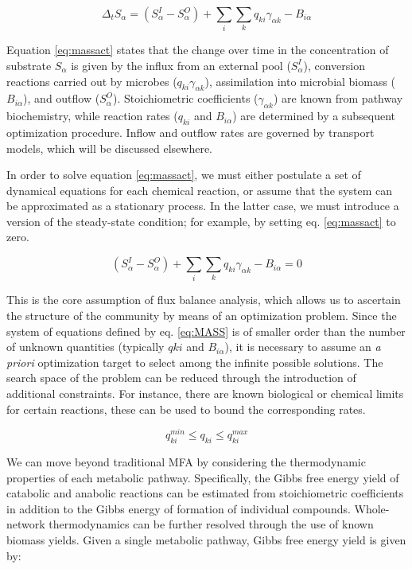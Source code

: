 \begin{equation}
    \Delta_{t} S_{\alpha} = (S_{\alpha}^{I} - S_{\alpha}^{O}) + \sum_{i} \sum_{k} q_{ki}\gamma_{\alpha k} - B_{i\alpha} 
    \label{eq:massact}
\end{equation}

Equation \ref{eq:massact} states that the change over time in the concentration of substrate $S_{\alpha}$ is given by the influx from an external pool ($S_{\alpha}^{I}$), conversion reactions carried out by microbes ($q_{ki}\gamma_{\alpha k}$), assimilation into microbial biomass ($B_{i\alpha}$), and outflow ($S_{\alpha}^{O}$). Stoichiometric coefficients ($\gamma_{\alpha k}$) are known from pathway biochemistry, while reaction rates ($q_{ki}$ and $B_{i\alpha}$) are determined by a subsequent optimization procedure. Inflow and outflow rates are governed by transport models, which will be discussed elsewhere.

In order to solve equation \ref{eq:massact}, we must either postulate a set of dynamical equations for each chemical reaction, or assume that the system can be approximated as a stationary process. In the latter case, we must introduce a version of the steady-state condition; for example, by setting eq. \ref{eq:massact} to zero.

\begin{equation}
    (S_{\alpha}^{I} - S_{\alpha}^{O}) + \sum_{i} \sum_{k} q_{ki}\gamma_{\alpha k} - B_{i\alpha} = 0
    \label{eq:MASS}
\end{equation}

This is the core assumption of flux balance analysis, which allows us to ascertain the structure of the community by means of an optimization problem. Since the system of equations defined by eq. \ref{eq:MASS} is of smaller order than the number of unknown quantities (typically $q{ki}$ and $B_{i\alpha}$), it is necessary to assume an \textit{a priori} optimization target to select among the infinite possible solutions. The search space of the problem can be reduced through the introduction of additional constraints. For instance, there are known biological or chemical limits for certain reactions, these can be used to bound the corresponding rates.

\begin{equation}
    q_{ki}^{min} \leq q_{ki} \leq q_{ki}^{max}
\end{equation}

We can move beyond traditional MFA by considering the thermodynamic properties of each metabolic pathway. Specifically, the Gibbs free energy yield of catabolic and anabolic reactions can be estimated from stoichiometric coefficients in addition to the Gibbs energy of formation of individual compounds. Whole-network thermodynamics can be further resolved through the use of known biomass yields. Given a single metabolic pathway, Gibbs free energy yield is given by:


